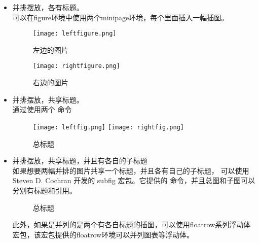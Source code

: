 \begin{itemize}
    \item 并排摆放，各有标题。\\
    可以在figure环境中使用两个minipage环境，每个里面插入一幅插图。
    
    \begin{texinlist}
    \begin{figure}[htbp]
    \centering
    \begin{minipage}{60pt}
    \centering \texttt{[image: leftfigure.png]} \caption{左边的图片}
    \end{minipage}
    \hspace{10pt}%
    \begin{minipage}{60pt}
    \centering
    \texttt{[image: rightfigure.png]} \caption{右边的图片}
    \end{minipage}
    \end{figure}
    \end{texinlist}
    \item 并排摆放，共享标题。\\
    通过使用两个  命令

   \begin{texinlist}
\begin{figure}[htbp]
\centering
\texttt{[image: leftfig.png]}
\texttt{[image: rightfig.png]}
\caption{总标题}
\end{figure}
    \end{texinlist}
    
    \item 并排摆放，共享标题，并且有各自的子标题 \\
    如果想要两幅并排的图片共享一个标题，并且各有自己的子标题， 可以使用Steven D. Cochran 开发的 subfig 宏包。它提供的  命令，并且总图和子图可以分别有标题和引用。
    
    \begin{texinlist}
\begin{figure}[htbp]
  \centering
  \hspace{10pt}%
  \caption{总标题}
  \label{fig:subfig}
\end{figure}
    \end{texinlist}

    此外，如果是并列的是两个有各自标题的插图，可以使用floatrow系列浮动体宏包，该宏包提供的floatrow环境可以并列图表等浮动体。
    
\end{itemize}


